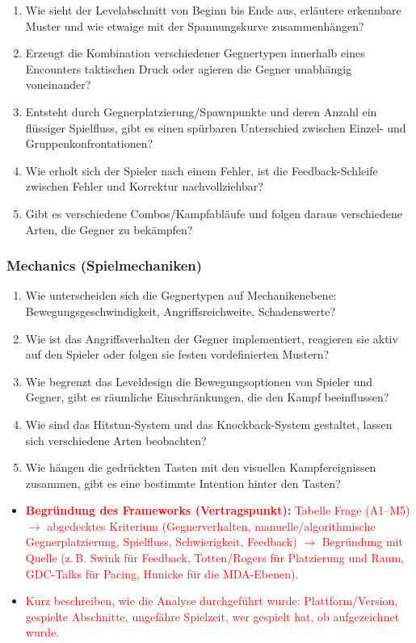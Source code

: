 \documentclass[../Main.tex]{subfiles}
\begin{document}
\begin{enumerate}[label=\textbf{D\arabic*}, leftmargin=1.5cm, itemsep=0.5em]
    \item Wie sieht der Levelabschnitt von Beginn bis Ende aus, erläutere erkennbare Muster und wie etwaige mit der Spannungskurve zusammenhängen?
    \item Erzeugt die Kombination verschiedener Gegnertypen innerhalb eines Encounters taktischen Druck oder agieren die Gegner unabhängig voneinander?
    \item Entsteht durch Gegnerplatzierung/Spawnpunkte und deren Anzahl ein flüssiger Spielfluss, gibt es einen spürbaren Unterschied zwischen Einzel- und Gruppenkonfrontationen?
    \item Wie erholt sich der Spieler nach einem Fehler, ist die Feedback-Schleife zwischen Fehler und Korrektur nachvollziehbar?
    \item Gibt es verschiedene Combos/Kampfabläufe und folgen daraus verschiedene Arten, die Gegner zu bekämpfen?
\end{enumerate}

\subsubsection{Mechanics (Spielmechaniken)}

\begin{enumerate}[label=\textbf{M\arabic*}, leftmargin=1.5cm, itemsep=0.5em]
    \item Wie unterscheiden sich die Gegnertypen auf Mechanikenebene: Bewegungsgeschwindigkeit, Angriffsreichweite, Schadenswerte?
    \item Wie ist das Angriffsverhalten der Gegner implementiert, reagieren sie aktiv auf den Spieler oder folgen sie festen vordefinierten Mustern?
    \item Wie begrenzt das Leveldesign die Bewegungsoptionen von Spieler und Gegner, gibt es räumliche Einschränkungen, die den Kampf beeinflussen?
    \item Wie sind das Hitstun-System und das Knockback-System gestaltet, lassen sich verschiedene Arten beobachten?
    \item Wie hängen die gedrückten Tasten mit den visuellen Kampfereignissen zusammen, gibt es eine bestimmte Intention hinter den Tasten?
\end{enumerate}

\begin{itemize}[leftmargin=1.5cm]
    \item \textcolor{red}{\textbf{Begründung des Frameworks (Vertragspunkt):} Tabelle Frage (A1--M5) $\rightarrow$ abgedecktes Kriterium (Gegnerverhalten, manuelle/algorithmische Gegnerplatzierung, Spielfluss, Schwierigkeit, Feedback) $\rightarrow$ Begründung mit Quelle (z.\,B. Swink für Feedback, Totten/Rogers für Platzierung und Raum, GDC-Talks für Pacing, Hunicke für die MDA-Ebenen).}
    \item \textcolor{red}{Kurz beschreiben, wie die Analyse durchgeführt wurde: Plattform/Version, gespielte Abschnitte, ungefähre Spielzeit, wer gespielt hat, ob aufgezeichnet wurde.}
\end{itemize}
\end{document}
